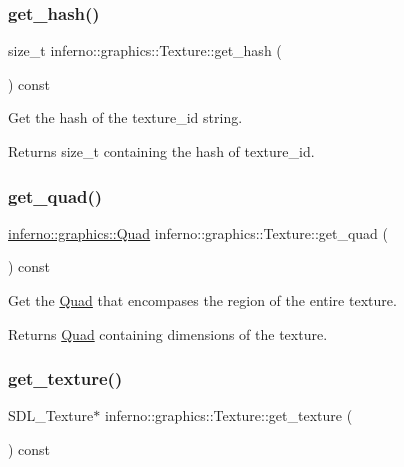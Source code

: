\subsubsection{\texorpdfstring{get\+\_\+hash()}{get\_hash()}}
{\footnotesize\ttfamily size\+\_\+t inferno\+::graphics\+::\+Texture\+::get\+\_\+hash (\begin{DoxyParamCaption}{ }\end{DoxyParamCaption}) const}



Get the hash of the texture\+\_\+id string. 

\begin{DoxyReturn}{Returns}
size\+\_\+t containing the hash of texture\+\_\+id. 
\end{DoxyReturn}
\mbox{\label{classinferno_1_1graphics_1_1_texture_a710559d0540e821183c7c1b4c6b2cd92}} 
\subsubsection{\texorpdfstring{get\+\_\+quad()}{get\_quad()}}
{\footnotesize\ttfamily \mbox{\hyperlink{classinferno_1_1graphics_1_1_quad}{inferno\+::graphics\+::\+Quad}} inferno\+::graphics\+::\+Texture\+::get\+\_\+quad (\begin{DoxyParamCaption}{ }\end{DoxyParamCaption}) const}



Get the \mbox{\hyperlink{classinferno_1_1graphics_1_1_quad}{Quad}} that encompases the region of the entire texture. 

\begin{DoxyReturn}{Returns}
\mbox{\hyperlink{classinferno_1_1graphics_1_1_quad}{Quad}} containing dimensions of the texture. 
\end{DoxyReturn}
\mbox{\label{classinferno_1_1graphics_1_1_texture_ab6961dc8a3c043744b518c73edae0890}} 
\subsubsection{\texorpdfstring{get\+\_\+texture()}{get\_texture()}}
{\footnotesize\ttfamily S\+D\+L\+\_\+\+Texture$\ast$ inferno\+::graphics\+::\+Texture\+::get\+\_\+texture (\begin{DoxyParamCaption}{ }\end{DoxyParamCaption}) const\hspace{0.3cm}{\ttfamily [inline]}}



